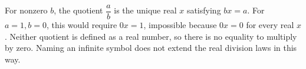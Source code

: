 For nonzero $b$, the quotient $\dfrac{a}{b}$ is the unique real $x$ satisfying $bx=a$. For $a=1,b=0$, this would require $0x=1$, impossible because $0x=0$ for every real $x$. Neither quotient is defined as a real number, so there is no equality to multiply by zero. Naming an infinite symbol does not extend the real division laws in this way.
